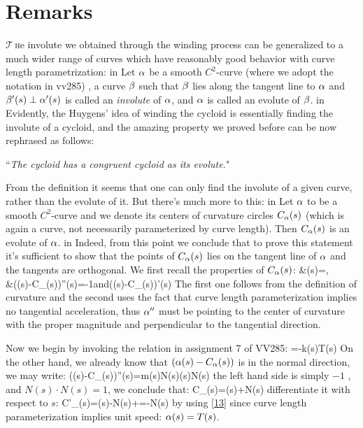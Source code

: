 \section{Remarks\hfill}
\lettrine[lines=2]{$\mathcal{T}$\,}\lowercase{h}e involute we obtained through the winding process can be generalized to a
much wider range of curves which have reasonably good behavior with curve
length parametrization\cite{mccleary2012geometry}:
 in
Let $\alpha$ be a smooth $C^2$-curve (where we adopt the notation in vv285)
, a curve $\beta$ such that $\beta$ lies along the tangent line to $\alpha$ and $\beta'(s)\perp\alpha'(s)$ is called an {\it involute} of $\alpha$, and $\alpha$ is called an evolute of $\beta$.
 in
Evidently, the Huygens' idea of winding the cycloid is essentially finding the 
involute of a cycloid, and the amazing property we proved before can be
now rephrased as follows:
\begin{center}
``{\it The cycloid has a congruent cycloid as its evolute.}"\cite{mccleary2012geometry}
\end{center}
From the definition it seems that one can only find the involute of a given
curve, rather than the evolute of it. But there's much more to this\cite{mccleary2012geometry}:
 in
Let $\alpha$ to be a smooth $C^2$-curve and we denote its centers of curvature circles $C_\alpha(s)$ (which is again a curve, not necessarily parameterized by curve length). Then $C_\alpha(s)$ is an evolute of $\alpha$.
 in
Indeed, from this point we conclude that to prove this statement it's sufficient
to show that the points of $C_\alpha(s)$ lies on the tangent line of $\alpha$ and 
the tangents are orthogonal. We first recall the properties of $C_{\alpha}(s)$:
\eq
{
&\kappa(s)=,\\
&(\a(s)-C_\a(s))\cdot\a''(s)=-1\quad \hbox{and}\quad (\a(s)-C_\a(s))\perp \a'(s)
}
The first one follows from the definition of curvature and the second uses
the fact that curve length parameterization  implies no tangential acceleration, thus $\alpha''$ must be pointing to the center of curvature with the proper magnitude and perpendicular to the tangential direction.

Now we begin by invoking the relation in assignment 7 of VV285:
\eq
{
=-k(s)T(s)
}
On the other hand, we already know that $(\alpha(s)-C_\alpha(s))$ is in the normal
direction, we may write:
\eq
{
(\a(s)-C_\a(s))\cdot\a''(s)=m(s)N(s)\cdot\kappa(s)N(s)
}
the left hand side is simply $-1$ , and $N(s)\cdot N(s)=1$, we conclude that:
\eq
{
C_\a(s)=\a(s)+N(s)
} 
differentiate it with respect to $s$:
\eq
{
C'_\a(s)=\a(s)-N(s)+=-N(s)
}
by using \eqref{13} since curve length parameterization implies unit speed: $\alpha(s)=T(s)$.

